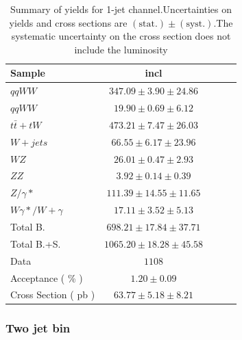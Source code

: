 \begin{table}[!ht]
{\small
\begin{center}
\begin{tabular}{|l|c|c|c|c|}
\hline
Sample	& incl	\\ \hline
$qqWW$	& $347.09 \pm 3.90 \pm 24.86 $	\\ 
$qqWW$	& $19.90 \pm 0.69 \pm 6.12 $	\\ 
$t\bar{t} + tW$	& $473.21 \pm 7.47 \pm 26.03 $	\\ 
$W+jets$	& $66.55 \pm 6.17 \pm 23.96 $	\\ 
$WZ$	& $26.01 \pm 0.47 \pm 2.93 $	\\ 
$ZZ$	& $3.92 \pm 0.14 \pm 0.39 $	\\ 
$Z/\gamma*$	& $111.39 \pm 14.55 \pm 11.65 $	\\ 
$W\gamma*/W+\gamma$	& $17.11 \pm 3.52 \pm 5.13 $	\\ 
\hline \hline 
Total B.	& $698.21 \pm 17.84 \pm 37.71 $	\\ \hline \hline 
Total B.+S.	& $1065.20 \pm 18.28 \pm 45.58 $	\\ \hline \hline
Data	& $1108$ 	\\ \hline \hline
Acceptance ( \% )	& $1.20 \pm 0.09 	$\\ 
Cross Section ( pb )	& $63.77 \pm 5.18 \pm 8.21$ 	\\ \hline
\end{tabular}
\caption{Summary of yields for 1-jet channel.Uncertainties on yields and cross sections are $\mathrm{(stat.)} \pm \mathrm{(syst.)}$.The systematic uncertainty on the cross section does not include the luminosity}
\label{tab:datayields_wwxsec_1j}
\end{center}}
\end{table}
\clearpage
\subsubsection{Two jet bin}

